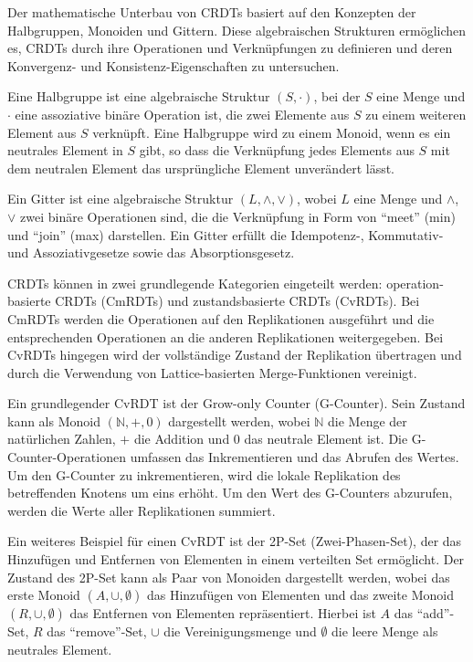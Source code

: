 Der mathematische Unterbau von CRDTs basiert auf den Konzepten der Halbgruppen, Monoiden und Gittern. Diese algebraischen Strukturen ermöglichen es, CRDTs durch ihre Operationen und Verknüpfungen zu definieren und deren Konvergenz- und Konsistenz-Eigenschaften zu untersuchen.

Eine Halbgruppe ist eine algebraische Struktur $(S, \cdot)$, bei der $S$ eine Menge und $\cdot$ eine assoziative binäre Operation ist, die zwei Elemente aus $S$ zu einem weiteren Element aus $S$ verknüpft. Eine Halbgruppe wird zu einem Monoid, wenn es ein neutrales Element in $S$ gibt, so dass die Verknüpfung jedes Elements aus $S$ mit dem neutralen Element das ursprüngliche Element unverändert lässt.

Ein Gitter ist eine algebraische Struktur $(L, \wedge, \vee)$, wobei $L$ eine Menge und $\wedge$, $\vee$ zwei binäre Operationen sind, die die Verknüpfung in Form von \enquote{meet} (min) und \enquote{join} (max) darstellen. Ein Gitter erfüllt die Idempotenz-, Kommutativ- und Assoziativgesetze sowie das Absorptionsgesetz.

CRDTs können in zwei grundlegende Kategorien eingeteilt werden: operation-basierte CRDTs (CmRDTs) und zustandsbasierte CRDTs (CvRDTs). Bei CmRDTs werden die Operationen auf den Replikationen ausgeführt und die entsprechenden Operationen an die anderen Replikationen weitergegeben. Bei CvRDTs hingegen wird der vollständige Zustand der Replikation übertragen und durch die Verwendung von Lattice-basierten Merge-Funktionen vereinigt.

Ein grundlegender CvRDT ist der Grow-only Counter (G-Counter). Sein Zustand kann als Monoid $(\mathbb{N}, +, 0)$ dargestellt werden, wobei $\mathbb{N}$ die Menge der natürlichen Zahlen, $+$ die Addition und $0$ das neutrale Element ist. Die G-Counter-Operationen umfassen das Inkrementieren und das Abrufen
des Wertes. Um den G-Counter zu inkrementieren, wird die lokale Replikation des betreffenden Knotens um eins erhöht. Um den Wert des G-Counters abzurufen, werden die Werte aller Replikationen summiert.

Ein weiteres Beispiel für einen CvRDT ist der 2P-Set (Zwei-Phasen-Set), der das Hinzufügen und Entfernen von Elementen in einem verteilten Set ermöglicht. Der Zustand des 2P-Set kann als Paar von Monoiden dargestellt werden, wobei das erste Monoid $(A, \cup, \emptyset)$ das Hinzufügen von Elementen und das zweite Monoid $(R, \cup, \emptyset)$ das Entfernen von Elementen repräsentiert. Hierbei ist $A$ das \enquote{add}-Set, $R$ das \enquote{remove}-Set, $\cup$ die Vereinigungsmenge und $\emptyset$ die leere Menge als neutrales Element.

